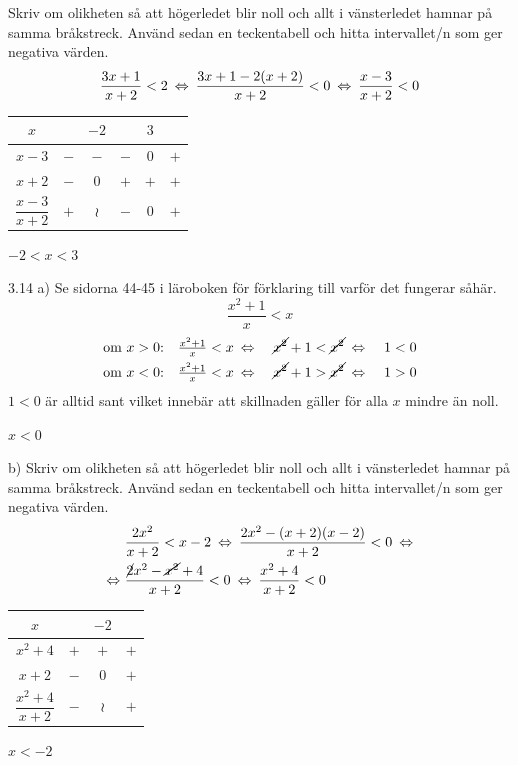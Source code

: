 \begin{task}{3.13}
	Skriv om olikheten så att högerledet blir noll och allt i vänsterledet hamnar på samma bråkstreck. Använd sedan en teckentabell och hitta intervallet/n som ger negativa värden.
	\[\dfrac{3x+1}{x+2}<2 \lra
	\dfrac{3x+1-2(x+2)}{x+2}<0 \lra
	\dfrac{x-3}{x+2}<0\]
	\begin{tabular}{c|c|c|c|c|c}
		$x$ & & $-2$ & & $3$ & \\ \hline
		$x-3$              & $-$ & $-$ & $-$ & $0$ & $+$ \\
		$x+2$              & $-$ & $0$ & $+$ & $+$ & $+$ \\ \hline
		$\dfrac{x-3}{x+2}$ & $+$ &$\wr$& $-$ & $0$ & $+$
	\end{tabular}
	
	\ans $-2<x<3$
\end{task}

\begin{task}{3.14 a)}
	Se sidorna 44-45 i läroboken för förklaring till varför det fungerar såhär.
	\[\dfrac{x^2+1}{x}<x\]
	\begin{align*}
	&\text{om } x>0\text{:} &\tfrac{x^2+1}{x}<x &\lra &\cancel{x^2}+1<\cancel{x^2} &\lra &1<0 \\
	&\text{om } x<0\text{:} &\tfrac{x^2+1}{x}<x &\lra &\cancel{x^2}+1>\cancel{x^2} &\lra &1>0
	\end{align*}
	$1<0$ är alltid sant vilket innebär att skillnaden gäller för alla $x$ mindre än noll.
	
	\ans $x<0$
\end{task}

\begin{task}{b)}
	Skriv om olikheten så att högerledet blir noll och allt i vänsterledet hamnar på samma bråkstreck. Använd sedan en teckentabell och hitta intervallet/n som ger negativa värden.
	\begin{align*}
	&\dfrac{2x^2}{x+2}<x-2 \lra
	\dfrac{2x^2-(x+2)(x-2)}{x+2}<0 \lra \\ \lra 
	&\dfrac{\cancel{2}x^2-\cancel{x^2}+4}{x+2}<0 \lra
	\dfrac{x^2+4}{x+2}<0
	\end{align*}
	\begin{tabular}{c|c|c|c}
		$x$ & & $-2$ & \\ \hline
		$x^2+4$              & $+$ & $+$ & $+$ \\
		$x+2$                & $-$ & $0$ & $+$ \\ \hline
		$\dfrac{x^2+4}{x+2}$ & $-$ &$\wr$& $+$
	\end{tabular}
	
	\ans $x<-2$
\end{task}

